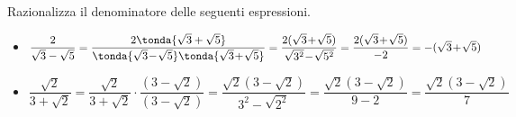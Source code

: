 % 
\begin{esempio}{}{}
Razionalizza il denominatore delle seguenti espressioni.
\begin{itemize} [left=0mm]
\item {\small\(\dfrac 2{\sqrt{3}-\sqrt 5}=
\dfrac{2\tonda{\sqrt{3}+\sqrt{5}}}
      {\tonda{\sqrt{3}\!-\!\sqrt 5}\tonda{\sqrt{3}\!+\!\sqrt{5}}}=
\dfrac{2(\sqrt{3}\!+\!\sqrt 5)}{\sqrt{3^2}\!-\!\sqrt{5^2}}=
\dfrac{2(\sqrt{3}\!+\!\sqrt 5)}{-2}=-(\sqrt{3}\!+\!\sqrt 5)\)}
\item {\small\(\dfrac{\sqrt{2}}{3+\sqrt{2}}=
\dfrac{\sqrt{2}}{3+\sqrt{2}} \cdot \dfrac{(3-\sqrt{2})}{(3-\sqrt{2})}=
\dfrac{\sqrt{2}(3-\sqrt{2})}{3^2-\sqrt{2^2}}=
\dfrac{\sqrt{2}(3-\sqrt{2})}{9-2}= \dfrac{\sqrt{2}(3-\sqrt{2})} 7\)}
\end{itemize}
\end{esempio}
% 

